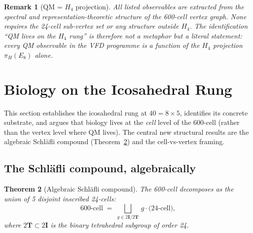 \documentclass[12pt]{article}
\newtheorem{theorem}{Theorem}
\newtheorem{remark}[theorem]{Remark}
\newcommand{\twoT}{2\mathbf{T}}
\newcommand{\twoI}{2\mathbf{I}}
\begin{document}
\begin{remark}[QM = $H_4$ projection]\label{rmk:qm-h4}
All listed observables are extracted from the spectral and representation-theoretic structure of the 600-cell vertex graph. None requires the 24-cell sub-vertex set or any structure outside $H_4$. The identification ``QM lives on the $H_4$ rung'' is therefore not a metaphor but a literal statement: every QM observable in the VFD programme is a function of the $H_4$ projection $\pi_H(E_8)$ alone.
\end{remark}

\section{Biology on the Icosahedral Rung}\label{sec:bio}

This section establishes the icosahedral rung at $40 = 8 \times 5$, identifies its concrete substrate, and argues that biology lives at the \emph{cell} level of the 600-cell (rather than the vertex level where QM lives). The central new structural results are the algebraic Schl\"afli compound (Theorem~\ref{thm:schlafli}) and the cell-vs-vertex framing.

\subsection{The Schl\"afli compound, algebraically}\label{sec:bio:schlafli}

\begin{theorem}[Algebraic Schl\"afli compound]\label{thm:schlafli}
The 600-cell decomposes as the union of 5 disjoint inscribed 24-cells:
\[
\text{600-cell} \;=\; \bigsqcup_{g \in \twoI / \twoT}\, g \cdot \text{(24-cell)},
\]
where $\twoT \subset \twoI$ is the binary tetrahedral subgroup of order 24.
\end{theorem}
\end{document}
